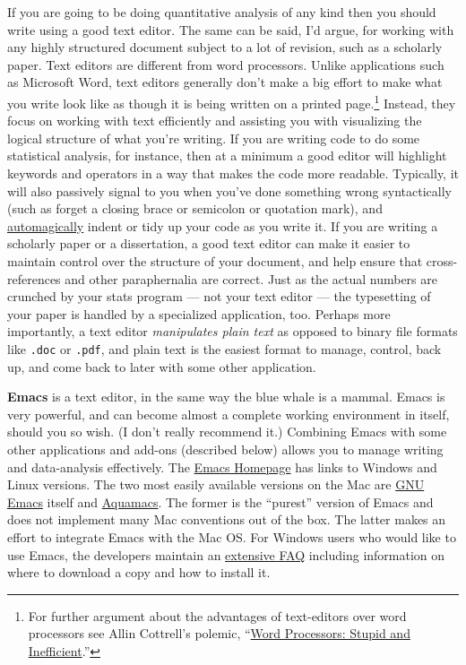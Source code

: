 \documentclass[11pt,article,oneside]{memoir}
\begin{document}
If you are going to be doing quantitative analysis of any kind then
you should write using a good text editor. The same can be said, I'd
argue, for working with any highly structured document subject to a
lot of revision, such as a scholarly paper. Text editors are different
from word processors. Unlike applications such as Microsoft Word, text
editors generally don't make a big effort to make what you write look
like as though it is being written on a printed page.\footnote{For
  further argument about the advantages of text-editors over word
  processors see Allin Cottrell's polemic,
  ``\href{http://www.ecn.wfu.edu/~cottrell/wp.html}{Word Processors:
    Stupid and Inefficient}.'' } Instead, they focus on working with
text efficiently and assisting you with visualizing the logical
structure of what you're writing. If you are writing code to do some
statistical analysis, for instance, then at a minimum a good editor
will highlight keywords and operators in a way that makes the code
more readable. Typically, it will also passively signal to you when
you've done something wrong syntactically (such as forget a closing
brace or semicolon or quotation mark), and
\href{http://en.wiktionary.org/wiki/automagical}{automagically} indent
or tidy up your code as you write it. If you are writing a scholarly
paper or a dissertation, a good text editor can make it easier to
maintain control over the structure of your document, and help ensure
that cross-references and other paraphernalia are correct. Just as the
actual numbers are crunched by your stats program --- not your text
editor --- the typesetting of your paper is handled by a specialized
application, too. Perhaps more importantly, a text editor
\emph{manipulates plain text} as opposed to binary file formats like
\texttt{.doc} or \texttt{.pdf}, and plain text is the easiest format
to manage, control, back up, and come back to later with some other
application.

\textbf{Emacs} is a text editor, in the same way the blue whale is a
mammal. Emacs is very powerful, and can become almost a complete
working environment in itself, should you so wish. (I don't really
recommend it.) Combining Emacs with some other applications and
add-ons (described below) allows you to manage writing and
data-analysis effectively. The
\href{http://www.gnu.org/software/emacs/}{Emacs Homepage} has links to
Windows and Linux versions. The two most easily available versions on
the Mac are \href{http://emacsformacosx.com/}{GNU Emacs} itself and
\href{http://aquamacs.org/}{Aquamacs}. The former is the ``purest''
version of Emacs and does not implement many Mac conventions out of
the box. The latter makes an effort to integrate Emacs with the Mac
OS. For Windows users who would like to use Emacs, the developers
maintain an
\href{http://www.gnu.org/software/emacs/windows/faq.html}{extensive
  FAQ} including information on where to download a copy and how to
install it.
\end{document}

